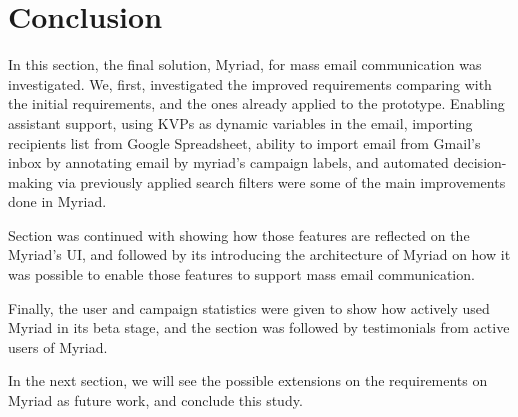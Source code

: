 \section{Conclusion}
\label{sec:5.5:Conc}

In this section, the final solution, Myriad, for mass email communication was investigated. We, first, investigated the improved requirements comparing with the initial requirements, and the ones already applied to the prototype. Enabling assistant support, using \ac{KVP}s as dynamic variables in the email, importing recipients list from Google Spreadsheet, ability to import email from Gmail's inbox by annotating email by myriad's campaign labels, and automated decision-making via previously applied search filters were some of the main improvements done in Myriad.
\vspace{1cm}

Section was continued with showing how those features are reflected on the Myriad's \ac{UI}, and followed by its introducing the architecture of Myriad on how it was possible to enable those features to support mass email communication.
\vspace{1cm}

Finally, the user and campaign statistics were given to show how actively used Myriad in its beta stage, and the section was followed by testimonials from active users of Myriad.
\vspace{1cm}

In the next section, we will see the possible extensions on the requirements on Myriad as future work, and conclude this study.

